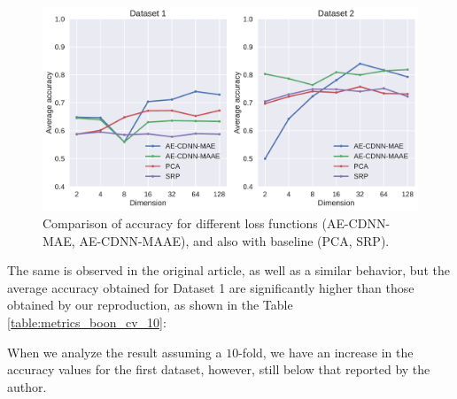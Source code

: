 \begin{figure}[!ht]
\centering
\includegraphics[width=\linewidth]{figure/baseline_methods.pdf}
    \caption{Comparison of accuracy for different loss functions (AE-CDNN-MAE, AE-CDNN-MAAE), and also with baseline (PCA, SRP).}
\label{fig:baseline_methods}
\end{figure}

The same is observed in the original article, as well as a similar behavior, but the average accuracy obtained for Dataset 1 are significantly higher than those obtained by our reproduction, as shown in the Table \ref{table:metrics_boon_cv_10}:

\begin{table}[!ht]
\centering
{}
\caption{Accuracy in Classification, in the first dataset with $CV=10$.}
\label{table:metrics_boon_cv_10}
\end{table}

When we analyze the result assuming a $10$-fold, we have an increase in the accuracy values for the first dataset, however, still below that reported by the author.

